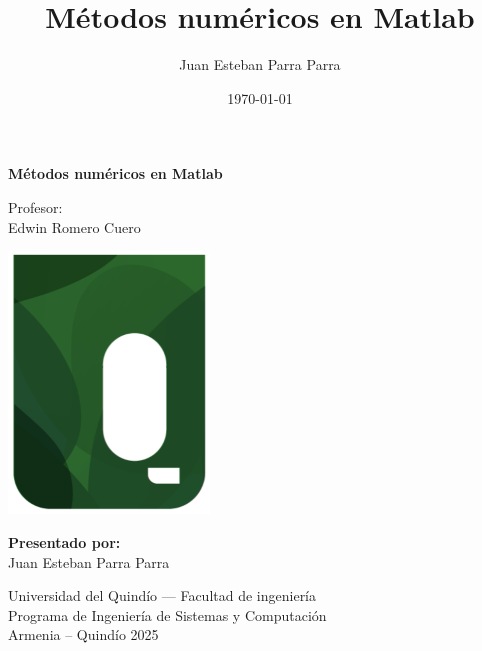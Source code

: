 \documentclass[12pt,a4paper]{article}
\title{Métodos numéricos en Matlab}
\author{Juan Esteban Parra Parra}
\date{\today}
\begin{document}
\begin{titlepage}
	\centering


	\vspace{2em}
	{\textbf{Métodos numéricos en Matlab}}

	{Profesor:}\\
	\vspace{0.1cm}
	{Edwin Romero Cuero}\\


	\vspace{1.2cm}

	\begin{center}
		\includegraphics[width=0.4\textwidth]{resources/uniquindio.png}
	\end{center}


	\vspace{1.1cm}
	{\textbf{Presentado por:}}\\
	\vspace{0.1cm}
	{Juan Esteban Parra Parra}\\

	\vfill{

		\vspace{1cm}
		\vspace{1cm}

		{Universidad del Quindío --- Facultad de ingeniería\\Programa de Ingeniería de Sistemas y Computación}\\
		\vspace{0.5cm}
		{Armenia -- Quindío 2025 }



	}

\end{titlepage}

\newpage
\tableofcontents
\newpage
\end{document}
